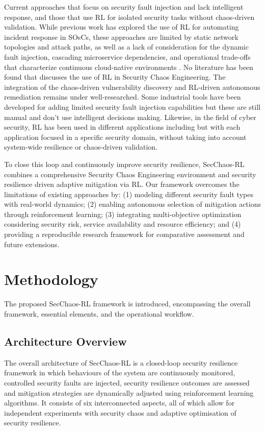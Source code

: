 \documentclass[pdflatex,sn-mathphys-num]{sn-jnl}%
\theoremstyle{thmstyleone}%
\theoremstyle{thmstyletwo}%
\theoremstyle{thmstylethree}%
\begin{document}
	Current approaches that focus on security fault injection and lack intelligent response, and those that use RL for isolated security tasks without chaos-driven validation. While previous work has explored the use of RL for automating incident response in SOsCs, these approaches are limited by static network topologies and attack paths, as well as a lack of consideration for the dynamic fault injection, cascading microservice dependencies, and operational trade-offs that characterize continuous cloud-native environments \cite{standen2021cyborg}. No literature has been found that discusses the use of RL in Security Chaos Engineering. The integration of the chaos-driven vulnerability discovery and RL-driven autonomous remediation remains under well-researched. Some industrial tools have been developed for adding limited security fault injection capabilities \cite{chaosblade2021, litmus2022} but these are still manual and don't use intelligent decisions making. Likewise, in the field of cyber security, RL has been used in different applications including \cite{nguyen2021deep, liu2025autonomous} but with each application focused in a specific security domain, without taking into account system-wide resilience or chaos-driven validation.
	
	To close this loop and continuously improve security resilience, SecChaos-RL combines a comprehensive Security Chaos Engineering environment and security resilience driven adaptive mitigation via RL. Our framework overcomes the limitations of existing approaches by: (1) modeling different security fault types with real-world dynamics; (2) enabling autonomous selection of mitigation actions through reinforcement learning; (3) integrating multi-objective optimization considering security risk, service availability and resource efficiency; and (4) providing a reproducible research framework for comparative assessment and future extensions.
	\section{Methodology}
	
The proposed SecChaos-RL framework is introduced, encompassing the overall framework, essential elements, and the operational workflow.
	
	\subsection{Architecture Overview}
	

The overall architecture of SecChaos-RL is a closed-loop security resilience framework in which behaviours of the system are continuously monitored, controlled security faults are injected, security resilience outcomes are assessed and mitigation strategies are dynamically adjusted using reinforcement learning algorithms. It consists of six interconnected aspects, all of which allow for independent experiments with security chaos and adaptive optimisation of security resilience. 
	
\end{document}
